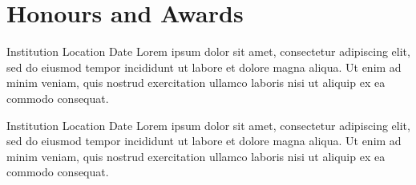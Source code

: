 \documentclass[12pt, a4paper]{effectivecv}
\begin{document}
{  \section{Honours and Awards}
    {Institution}
    {Location}
    {Date}
    {Lorem ipsum dolor sit amet, consectetur adipiscing elit, sed do eiusmod tempor incididunt ut labore et dolore magna aliqua. Ut enim ad minim veniam, quis nostrud exercitation ullamco laboris nisi ut aliquip ex ea commodo consequat.}
    
    {Institution}
    {Location}
    {Date}
    {Lorem ipsum dolor sit amet, consectetur adipiscing elit, sed do eiusmod tempor incididunt ut labore et dolore magna aliqua. Ut enim ad minim veniam, quis nostrud exercitation ullamco laboris nisi ut aliquip ex ea commodo consequat.}
}
\end{document}

